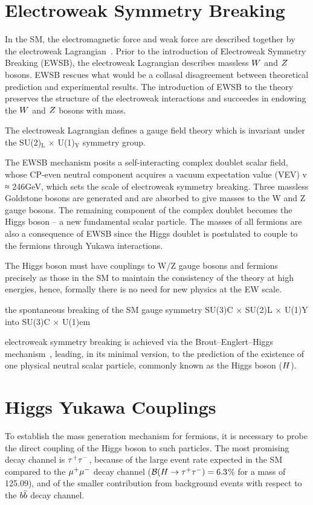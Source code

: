\section{Electroweak Symmetry Breaking}
In the SM, the electromagnetic force and weak force are described together by
the electroweak Lagrangian~\cite{Glashow:1961tr,SM1,SM3}.
Prior to the introduction of Electroweak Symmetry Breaking (EWSB),
the electroweak Lagrangian describes massless $W$ and $Z$ bosons.
EWSB rescues what would be a collasal disagreement between theoretical prediction
and experimental results. The introduction of EWSB to the theory preserves the structure of
the electroweak interactions and succeedes in endowing the $W$ and $Z$ bosons
with mass.

The electroweak Lagrangian defines a gauge field theory which is 
invariant under the SU(2)$_{\text{L}} \, \times \, $U(1)$_{\text{Y}}$ symmetry group. 





The EWSB mechanism posits a self-interacting complex doublet scalar field, whose CP-even neutral component acquires a vacuum expectation value (VEV) v ≈ 246GeV, which sets the scale of electroweak symmetry breaking. Three massless Goldstone bosons are generated and are absorbed to give masses to the W and Z gauge bosons. The remaining component of the complex doublet becomes the Higgs boson – a new fundamental scalar particle. The masses of all fermions are also a consequence of EWSB since the Higgs doublet is postulated to couple to the fermions through Yukawa interactions.


The Higgs boson must have couplings to W/Z gauge bosons and fermions precisely as those in the SM to maintain the consistency of the theory at high energies, hence, formally there is no need for new physics at the EW scale.



the spontaneous breaking of the SM gauge symmetry SU(3)C × SU(2)L × U(1)Y into SU(3)C × U(1)em

electroweak symmetry breaking is achieved via the Brout--Englert--Higgs
mechanism~\cite{Englert:1964et,Higgs:1964ia,Higgs:1964pj,Guralnik:1964eu,Higgs:1966ev,Kibble:1967sv},
leading, in its minimal version, to the prediction of the existence of one physical neutral scalar particle,
commonly known as the Higgs boson ($H$).


\section{Higgs Yukawa Couplings}
To establish the mass generation mechanism for fermions,
 it is necessary to probe the direct coupling of
the Higgs boson to such particles.
The most promising decay channel is $\tau^+\tau^-$,
because of the large event rate expected in the SM compared to the $\mu^+\mu^-$ decay channel ($\mathcal{B}(H\to\tau^+\tau^-)=6.3$\% for a mass of 125.09\GeV), and of the smaller contribution from background events
with respect to the $b\bar{b}$ decay channel.

